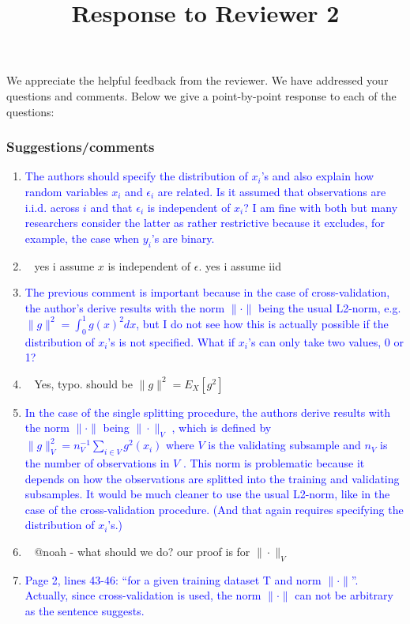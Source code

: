 \documentclass[]{article}
\title{Response to Reviewer 2}
\newcommand{\point}[1]{\item \textcolor{blue}{#1}}
\newcommand{\reply}{\item[]\ }
\begin{document}
	
	\maketitle
	
	We appreciate the helpful feedback from the reviewer. We have addressed your questions and comments. Below we give a point-by-point response to each of the questions:
	
	\subsubsection*{Suggestions/comments}
	
	\begin{enumerate}
		\point{
			The authors should specify the distribution of $x_i$'s and also explain how random variables $x_i$ and $\epsilon_i$ are related. Is it assumed that observations are i.i.d. across $i$ and that $\epsilon_i$ is independent of $x_i$? I am fine with both but many researchers consider the latter as rather restrictive because it excludes, for example, the case when $y_i$’s are binary.
		}
	
		\reply{
			yes i assume $x$ is independent of $\epsilon$.
			yes i assume iid
		}
		
		\point {
			The previous comment is important because in the case of cross-validation, the author's derive results with the norm $\| \cdot \|$ being the usual L2-norm, e.g. $\|g\|^2 = \int_0^1 g(x)^2 dx $, but I do not see how this is actually possible if the distribution of $x_i$’s is not specified. What if $x_i$’s can only take two values, 0 or 1?
		}
	
		\reply{
			Yes, typo. should be $\|g\|^2 = E_X[g^2]$
		}
		
	
		\point{
			In the case of the single splitting procedure, the authors derive results with the norm $\|\cdot\|$ being $\|\cdot\|_V$ , which is defined by $\|g \|_V^2 = n_V^{-1} \sum_{i\in V} g^2(x_i)$ where $V$ is the validating subsample and $n_V$ is the number of observations in $V$ . This norm is problematic because it depends on how the observations are splitted into the training and validating subsamples. It would be much cleaner to use the usual L2-norm, like in the case of the cross-validation procedure. (And that again requires specifying the distribution of $x_i$’s.)
		}
	
		\reply{
			@noah - what should we do? our proof is for $\|\cdot\|_V$
		}
	
		\point{
			Page 2, lines 43-46: “for a given training dataset T and norm $\|\cdot \|$”. Actually, since cross-validation is used, the norm $\|\cdot \|$ can not be arbitrary as the sentence suggests.
		}
	

\end{enumerate}
\end{document}
